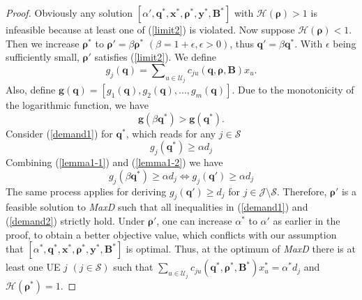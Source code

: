 \documentclass[10pt,journal,final,finalsubmission,twocolumn]{IEEEtran}
\begin{document}
\begin{proof}
Obviously any solution $[\alpha', \boldsymbol{q}^*,\boldsymbol{x}^*,\boldsymbol{\rho}^*, \boldsymbol{y}^*,\boldsymbol{B}^*]$ with $\mathcal{H}(\boldsymbol{\rho}) > 1$ is infeasible because at least one of (\ref{limit2}) is violated. Now suppose $\mathcal{H}(\boldsymbol{\rho}) < 1$. Then we increase $\boldsymbol{\rho}^*$ to $\boldsymbol{\rho}' =\beta\boldsymbol{\rho}^*$ $(\beta = 1 + \epsilon, \epsilon > 0)$, thus $\boldsymbol{q}' = \beta\boldsymbol{q}^*$. With $\epsilon$ being sufficiently small, $\boldsymbol{\rho}' $ satisfies (\ref{limit2}). We define 
\begin{equation}
g_j (\boldsymbol{q}) = \sum\nolimits_{u\in \mathcal{U}_j} c_{ju}\left (\boldsymbol{q},\boldsymbol{ \rho}, \boldsymbol{B}\right ) x_u.
\end{equation}
Also, define $\boldsymbol{g} (\boldsymbol{q}) = [g_1 (\boldsymbol{q}),g_2 (\boldsymbol{q}),...,g_m (\boldsymbol{q})]$. Due to the monotonicity of the logarithmic function, we have 
\begin{equation}\label{lemma1-1}
  \boldsymbol{g} (\beta\boldsymbol{q}^*) >\boldsymbol{g} (\boldsymbol{q}^*). 
\end{equation}
Consider (\ref{demand1}) for $\boldsymbol{q}^*$, which reads for any $j\in \mathcal{S}$
\begin{equation}\label{lemma1-2}
g_j (\boldsymbol{q}^*) \geq \alpha d_j 
\end{equation}
Combining (\ref{lemma1-1}) and (\ref{lemma1-2}) we have 
\begin{equation}
g_j (\beta\boldsymbol{q}^*) \geq \alpha d_j \Leftrightarrow g_j (\boldsymbol{q}') \geq \alpha d_j 
\end{equation}
The same process applies for deriving $ g_j (\boldsymbol{q}') \geq  d_j $ for $j\in \mathcal{J}\setminus\mathcal{S}$. Therefore, $\boldsymbol{\rho}'$ is a feasible solution to {\em MaxD} such that all inequalities in (\ref{demand1}) and (\ref{demand2}) strictly hold. Under $\boldsymbol{\rho}'$, one can increase $\alpha^*$ to $\alpha '$ as earlier in the proof, to obtain a better objective value, which conflicts with our assumption that $[\alpha ^*, \boldsymbol{q}^*,\boldsymbol{x}^*,\boldsymbol{\rho}^*, \boldsymbol{y}^*,\boldsymbol{B}^*]$ is optimal.
Thus, at the optimum of {\em MaxD} there is at least one UE $j$ $(j\in \mathcal{S})$ such that $\sum_{u\in \mathcal{U}_j} c_{ju}\left (\boldsymbol{q}^*,\boldsymbol{ \rho}^*, \boldsymbol{B}^*\right )x_u^*= \alpha^* d_j$ and $\mathcal{H}(\boldsymbol{\rho^*}) = 1$.
\end{proof}
\
\end{document}
